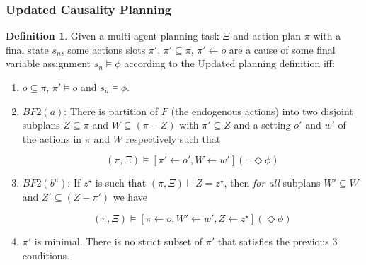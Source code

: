 \documentclass{beamer}
\theoremstyle{plain}
\theoremstyle{definition}
\newtheorem{defn}[thm]{Definition} %
\begin{document}
\begin{frame}
\frametitle{Updated Causality Planning}
\small
\begin{defn}
Given a multi-agent planning task $\Xi$ and action plan $\pi$ with a final state $s_n$, some actions slots $\pi'$, $\pi' \subseteq \pi$, $\pi' \leftarrow o$ are a cause of some final variable assignment $s_n \models \phi$ according to the Updated planning definition iff:
\begin{enumerate}
\item  $o \subseteq \pi$, $\pi' \models o$ and $s_n \models \phi$.



\item $BF2(a)$: There is partition of $F$ (the endogenous actions) into two disjoint subplans $Z \subseteq \pi$ and $W \subseteq (\pi - Z)$ with $\pi' \subseteq Z$ and a setting $o'$ and $w'$ of the actions in $\pi$ and $W$ respectively such that

\[
(\pi, \Xi) \models [\pi' \leftarrow o', W \leftarrow w'](\lnot \Diamond \phi)
\]

\item $BF2(b^u)$: If $z^\star$ is such that $(\pi, \Xi) \models Z = z^\star$, then \textit{for all} subplans $W' \subseteq W$ and $Z' \subseteq (Z - \pi')$ we have

\[
(\pi, \Xi) \models [\pi \leftarrow o, W' \leftarrow w', Z \leftarrow z^\star](\Diamond \phi)
\]

\item $\pi'$ is minimal. There is no strict subset of $\pi'$ that satisfies the previous 3 conditions.
\end{enumerate}
\end{defn}

\end{frame}
\end{document}
